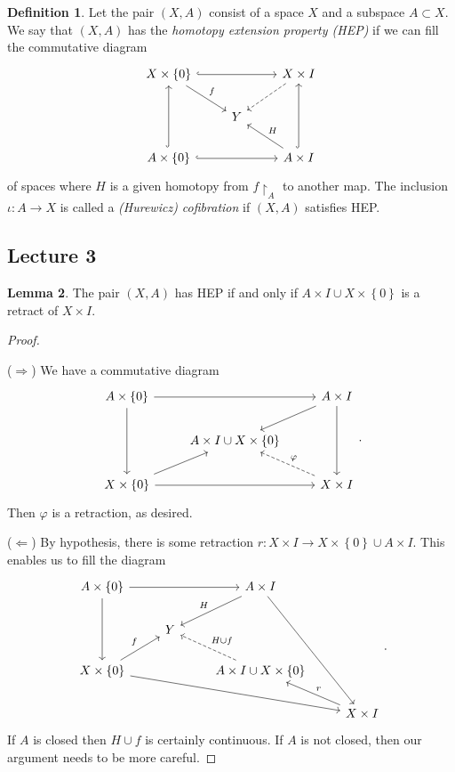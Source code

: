 \documentclass[10pt,letterpaper,cm]{nupset}
\theoremstyle{definition}
\newtheorem{definition}{Definition}[subsection]
\theoremstyle{theorem}
\newtheorem{lemma}[definition]{Lemma}
\theoremstyle{remark}
\newcommand{\1}{\mathbb{1}}
\newcommand{\0}{\vec 0}
\begin{document}
\begin{definition}
Let the pair $\left(X, A\right)$ consist of a space $X$ and a subspace $A \subset X$. We say that $\left(X, A\right)$ has the \textit{homotopy extension property (HEP)} if we can fill the commutative diagram
\[
\begin{tikzcd}
X\times \left\{0\right\} \arrow[rr, hook] \arrow[rd, "f"] &  & X\times I \arrow[ld, dashed] \\
 & Y &  \\
A\times \left\{0\right\} \arrow[uu, hook] \arrow[rr, hook] &  & A\times I \arrow[uu, hook] \arrow[lu, "H"']
\end{tikzcd}
\] of spaces where $H$ is a given homotopy from $f \restriction_{A}$ to another map. The inclusion $\iota : A \to X$ is called a \textit{(Hurewicz) cofibration} if $\left(X, A\right)$ satisfies HEP.
\end{definition}

\subsection{Lecture 3}

\begin{lemma}
The pair $\left(X, A\right)$ has HEP if and only if $A\times I \cup X \times \left\{0\right\}$ is a retract of $X\times I$.
\end{lemma}
\begin{proof} $ $

\smallskip

($\Longrightarrow$) We have a commutative diagram
\[
\begin{tikzcd}
A\times \left\{0\right\} \arrow[dd] \arrow[rr] &  & A\times I \arrow[ld] \arrow[dd] \\
 & A\times I \cup X \times \left\{0\right\} &  \\
X\times \left\{0\right\} \arrow[ru] \arrow[rr] &  & X\times I \arrow[lu, "\varphi"', dashed]
\end{tikzcd}
.\] Then $\varphi$ is a retraction, as desired. 

\medskip

($\Longleftarrow$) By hypothesis, there is some retraction $r: X\times I \to X\times \left\{0\right\} \cup A \times I$. This enables us to fill the diagram
\[
\begin{tikzcd}
A\times \left\{0\right\} \arrow[dd] \arrow[rr] &  & A\times I \arrow[ld, "H"'] \arrow[rddd] &  \\
 & Y &  &  \\
X\times \left\{0\right\} \arrow[ru, "f"] \arrow[rrrd] &  & A\times I \cup X \times \left\{0\right\} \arrow[lu, "H \cup f"', dashed] &  \\
 &  &  & X\times I \arrow[lu, "r"']
\end{tikzcd}
.\] If $A$ is closed then $H\cup f$ is certainly continuous. If $A$ is not closed, then our argument needs to be more careful. 
\end{proof}
\end{document}
